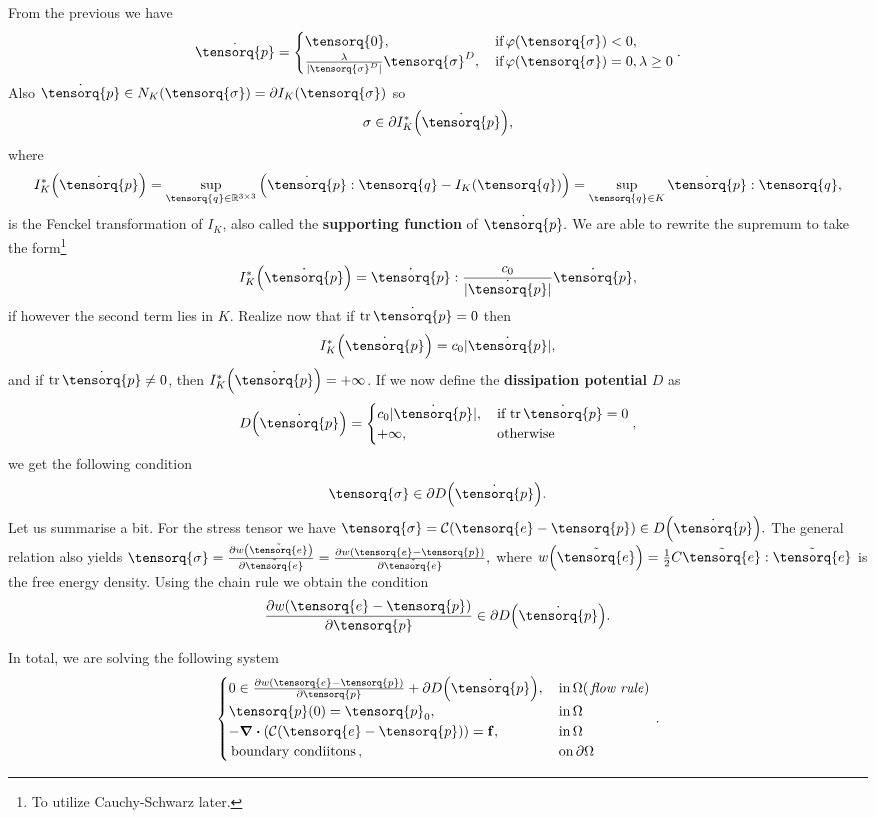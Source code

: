 \documentclass[11pt]{scrartcl} %
\begin{document}
From the previous we have
\[
	\dot{\tensorq{p}} = \begin{cases}
		\tensorq{0}, & \, \text{if} \, \varphi\qty(\tensorq{\sigma})<0, \\
		\frac{\lambda}{|\tensorq{\sigma}^D|}\tensorq{\sigma}^D, & \, \text{if} \, \varphi\qty(\tensorq{\sigma}) = 0, \lambda \geq 0
	\end{cases}.
\]
Also $\dot{\tensorq{p}} \in N_K\qty(\tensorq{\sigma}) = \partial I_K\qty(\tensorq{\sigma})$ so
\[
	\sigma \in \partial I_K^{*}\qty(\dot{\tensorq{p}}),
\]
where
\[
	I_K^{*}\qty(\dot{\tensorq{p}}) = \sup_{\tensorq{q}\in \R^{3 \times 3}}\qty(\dot{\tensorq{p}}: \tensorq{q}- I_K\qty(\tensorq{q})) = \sup_{\tensorq{q}\in K}\dot{\tensorq{p}}: \tensorq{q},
\]
is the Fenckel transformation of $I_K$, also called the \textbf{supporting function} of $\dot{\tensorq{p}}.$ We are able to rewrite the supremum to take the form\footnote{To utilize Cauchy-Schwarz later.}
\[
	I_K^{*}\qty(\dot{\tensorq{p}}) = \dot{\tensorq{p}} : \frac{c_0}{|\dot{\tensorq{p}}|}\dot{\tensorq{p}},
\]
if however the second term lies in $K$. Realize now that if $\tr \dot{\tensorq{p}} = 0$ then
\[
	I_K^{*}\qty(\dot{\tensorq{p}}) = c_0 |\dot{\tensorq{p}}|,
\]
and if $\tr \dot{\tensorq{p}} \neq 0$, then $I_K^{*}\qty(\dot{\tensorq{p}})= + \infty$. If we now define the \textbf{dissipation potential} $D$ as
\[
	D\qty(\dot{\tensorq{p}}) = \begin{cases}
		c_0 |\dot{\tensorq{p}}|, & \, \text{if} \, \tr \dot{\tensorq{p}} = 0 \\
		+ \infty, & \, \text{otherwise} \,
	\end{cases},
\]
we get the following condition
\[
	\tensorq{\sigma} \in \partial D\qty(\dot{\tensorq{p}}).
\]
Let us summarise a bit. For the stress tensor we have $\tensorq{\sigma} = \mathcal{C}\qty(\tensorq{e}-\tensorq{p}) \in D\qty(\dot{\tensorq{p}}).$ The general relation also yields $\tensorq{\sigma}= \pdv{w\qty(\tilde{\tensorq{e}})}{\tilde{\tensorq{e}}} = \pdv{w\qty(\tensorq{e}-\tensorq{p})}{\tilde{\tensorq{e}}}, $ where $w\qty(\tilde{\tensorq{e}}) = \frac{1}{2}C \tilde{\tensorq{e}}: \tilde{\tensorq{e}}$ is the free energy density. Using the chain rule we obtain the condition
\[
	\pdv{w\qty(\tensorq{e}-\tensorq{p})}{\tensorq{p}} \in \partial D\qty(\dot{\tensorq{p}}).
\]

In total, we are solving the following system 
\begin{equation*}
    \begin{cases}
	    0 \in \pdv{w\qty(\tensorq{e}-\tensorq{p})}{\tensorq{p}} + \partial D\qty(\dot{\tensorq{p}}), & \, \text{in} \, \Omega (\, \text{\textit{flow rule}}) \, \\
	    \tensorq{p}(0) = \tensorq{p}_0, & \, \text{in} \, \Omega \\
	    - \divergence{\qty(\mathcal{C}\qty(\tensorq{e}-\tensorq{p}))}= \vb{f}, &\, \text{in} \,\Omega \\
	    \, \text{boundary condiitons} \,, & \, \text{on} \,\partial \Omega
    \end{cases}.
\end{equation*}
\end{document}

